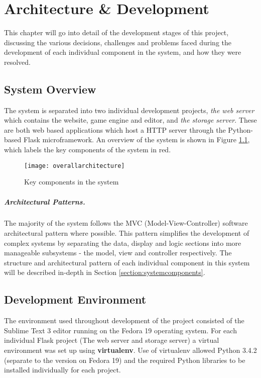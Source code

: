 \chapter{Architecture \& Development}
This chapter will go into detail of the development stages of this project, discussing the various decisions, challenges and problems faced during the development of each individual component in the system, and how they were resolved.

\section{System Overview}
The system is separated into two individual development projects, \emph{the web server} which contains the website, game engine and editor, and \emph{the storage server}. These are both web based applications which host a HTTP server through the Python-based Flask microframework. An overview of the system is shown in Figure \ref{fig:overallarchitecture}, which labels the key components of the system in red.

\begin{figure}[h]
	\centering
	\texttt{[image: overallarchitecture]}
	\caption{Key components in the system}
	\label{fig:overallarchitecture}
\end{figure}

\paragraph{Architectural Patterns.}
The majority of the system follows the MVC (Model-View-Controller) software architectural pattern where possible. This pattern simplifies the development of complex systems by separating the data, display and logic sections into more manageable subsystems - the model, view and controller respectively. The structure and architectural pattern of each individual component in this system will be described in-depth in Section \ref{section:systemcomponents}.


\section{Development Environment}
The environment used throughout development of the project consisted of the Sublime Text 3 editor running on the Fedora 19 operating system. For each individual Flask project (The web server and storage server) a virtual environment was set up using \textbf{virtualenv}. Use of virtualenv allowed Python 3.4.2 (separate to the version on Fedora 19) and the required Python libraries to be installed individually for each project.

